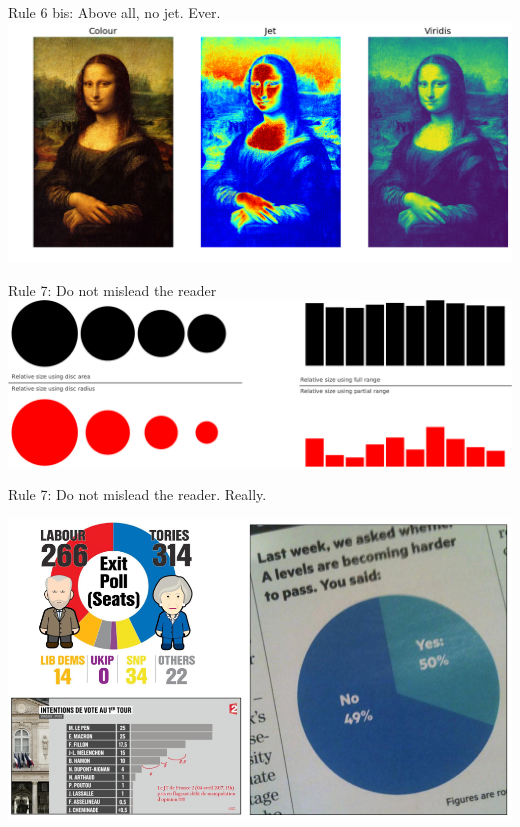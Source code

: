 \documentclass[10pt,aspectratio=169]{beamer}
\begin{document}
\begin{frame}{Rule 6 bis: Above all, no jet. Ever.}
  \includegraphics[width=\textwidth]{rule-6bis.png}
\end{frame}

\begin{frame}{Rule 7: Do not mislead the reader}
  \includegraphics[width=\textwidth]{rule-7.pdf}
\end{frame}

\begin{frame}{Rule 7: Do not mislead the reader. Really.}
  \begin{center}
    \includegraphics[width=.75\textwidth]{rule-7bis.png}
  \end{center}
\end{frame}
\end{document}
